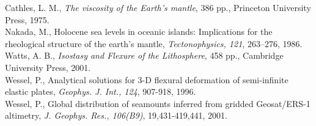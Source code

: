 \documentclass[12pt]{article}
\begin{document}
\noindent
Cathles, L. M., {\it The viscosity of the Earth's mantle}, 386 pp., Princeton University Press, 1975. \\
Nakada, M., Holocene sea levels in oceanic islands: Implications for the rheological structure of the earth's mantle, {\it Tectonophysics, 121}, 263--276, 1986.\\
Watts, A. B., {\it Isostasy and Flexure of the Lithosphere}, 458 pp., Cambridge University Press, 2001.\\
Wessel, P., Analytical solutions for 3-D flexural deformation of semi-infinite elastic plates, {\it Geophys. J. Int., 124}, 907-918, 1996.\\
Wessel, P., Global distribution of seamounts inferred from gridded Geosat/ERS-1 altimetry, {\it J. Geophys. Res., 106(B9)}, 19,431-419,441, 2001.\\
\end{document}
